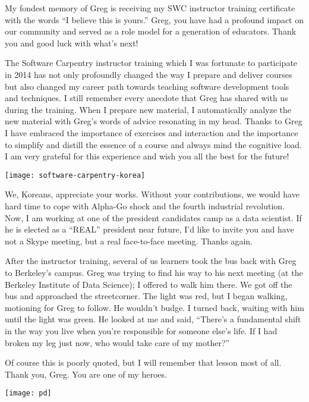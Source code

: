 My fondest memory of Greg is receiving my SWC instructor training certificate
with the words ``I believe this is yours.'' Greg, you have had a profound
impact on our community and served as a role model for a generation of
educators.  Thank you and good luck with what's next!



The Software Carpentry instructor training which I was fortunate to participate
in 2014 has not only profoundly changed the way I prepare and deliver courses
but also changed my career path towards teaching software development tools and
techniques. I still remember every anecdote that Greg has shared with us during
the training. When I prepare new material, I automatically analyze the new
material with Greg's words of advice resonating in my head. Thanks to Greg I
have embraced the importance of exercises and interaction and the importance to
simplify and distill the essence of a course and always mind the cognitive
load. I am very grateful for this experience and wish you all the best for the
future!


\newpage

\texttt{[image: software-carpentry-korea]}

We, Koreans, appreciate your works. Without your contributions, we would have
hard time to cope with Alpha-Go shock and the fourth industrial revolution.
Now, I am working at one of the president candidates camp as a data scientist.
If he is elected as a ``REAL'' president near future, I'd like to invite you
and have not a Skype meeting, but a real face-to-face meeting. Thanks again. 

\newpage

\begin{center}
\begin{minipage}{0.45\textwidth}
\setlength{\parindent}{0in}
\setlength{\parskip}{1em}

After the instructor training, several of us learners took the bus back with
Greg to Berkeley's campus. Greg was trying to find his way to his next meeting
(at the Berkeley Institute of Data Science); I offered to walk him there. We
got off the bus and approached the streetcorner. The light was red, but I began
walking, motioning for Greg to follow. He wouldn't budge. I turned back,
waiting with him until the light was green. He looked at me and said, ``There's
a fundamental shift in the way you live when you're responsible for someone
else's life. If I had broken my leg just now, who would take care of my
mother?''

Of course this is poorly quoted, but I will remember that lesson most of all.
Thank you, Greg. You are one of my heroes.

\end{minipage}
\hfill
\begin{minipage}{0.45\textwidth}
    \texttt{[image: pd]}
\end{minipage}
\end{center}

